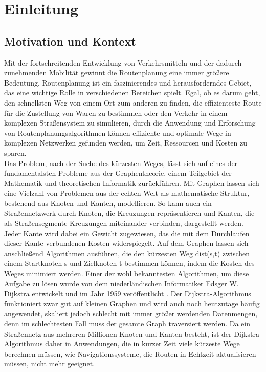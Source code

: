 \section{Einleitung}

\subsection{Motivation und Kontext}
Mit der fortschreitenden Entwicklung von Verkehrsmitteln und der dadurch zunehmenden Mobilität
gewinnt die Routenplanung eine immer größere Bedeutung. Routenplanung ist ein faszinierendes und
herausforderndes Gebiet, das eine wichtige Rolle in verschiedenen Bereichen spielt. Egal, ob es
darum geht, den schnellsten Weg von einem Ort zum anderen zu finden, die effizienteste Route für die
Zustellung von Waren zu bestimmen oder den Verkehr in einem komplexen Straßensystem zu simulieren,
durch die Anwendung und Erforschung von Routenplanungsalgorithmen können effiziente und optimale
Wege in komplexen Netzwerken gefunden werden, um Zeit, Ressourcen und Kosten zu sparen.\\

Das Problem, nach der Suche des kürzesten Weges, lässt sich auf eines der fundamentalsten Probleme
aus der Graphentheorie, einem Teilgebiet der Mathematik und theoretischen Informatik %
zurückführen. Mit Graphen lassen sich eine Vielzahl von Problemen aus der echten Welt als
mathematische Struktur, bestehend aus Knoten und Kanten, modellieren. So kann auch ein
Straßennetzwerk durch Knoten, die Kreuzungen repräsentieren und Kanten, die als Straßensegmente
Kreuzungen miteinander verbinden, dargestellt werden. Jeder Kante wird dabei ein Gewicht zugewiesen,
das die mit dem Durchlaufen dieser Kante verbundenen Kosten widerspiegelt. Auf dem Graphen lassen
sich anschließend Algorithmen ausführen, die den kürzesten Weg dist(s,t) zwischen einem Startknoten
s und Zielknoten t bestimmen können, indem die Kosten des Weges minimiert werden. Einer der wohl
bekanntesten Algorithmen, um diese Aufgabe zu lösen wurde von dem niederländischen Informatiker
Edsger W. Dijkstra entwickelt und im Jahr 1959 veröffentlicht \cite{Dijkstra_1959}. Der
Dijkstra-Algorithmus funktioniert zwar gut auf kleinen Graphen und wird auch noch heutzutage häufig
angewendet, skaliert jedoch schlecht mit immer größer werdenden Datenmengen, denn im schlechtesten
Fall muss der gesamte Graph traversiert werden. Da ein Straßennetz aus mehreren Millionen Knoten und
Kanten besteht, ist der Dijkstra-Algorithmus daher in Anwendungen, die in kurzer Zeit viele kürzeste
Wege berechnen müssen, wie \zB Navigationssysteme, die Routen in Echtzeit aktualisieren müssen,
nicht mehr geeignet.

